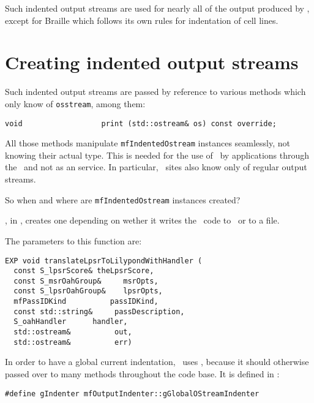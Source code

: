 Such indented output streams are used for nearly all of the output produced by \mf, except for Braille which follows its own rules for indentation of cell lines.


\section{Creating indented output streams}

Such indented output streams are passed by reference to various methods which only know of {\tt osstream}, among them:
\begin{lstlisting}[language=CPlusPlus]
    void                  print (std::ostream& os) const override;
\end{lstlisting}

All those methods manipulate {\tt mfIndentedOstream} instances seamlessly, not knowing their actual type.
This is needed for the use of \mf\ by applications through the \API\ and not as an service. In particular, \Web\ sites also know only of regular output streams.

So when and where are {\tt mfIndentedOstream} instances created?

, in , creates one depending on wether it writes the \lily\ code to \standardOutput\ or to a file.

The parameters to this function are:
\begin{lstlisting}[language=CPlusPlus]
EXP void translateLpsrToLilypondWithHandler (
  const S_lpsrScore& theLpsrScore,
  const S_msrOahGroup&     msrOpts,
  const S_lpsrOahGroup&    lpsrOpts,
  mfPassIDKind          passIDKind,
  const std::string&     passDescription,
  S_oahHandler      handler,
  std::ostream&          out,
  std::ostream&          err)
\end{lstlisting}

In order to have a global current indentation, \mf\ uses , because it should otherwise passed over to many methods throughout the code base. It is defined in :
\begin{lstlisting}[language=CPlusPlus]
#define gIndenter mfOutputIndenter::gGlobalOStreamIndenter
\end{lstlisting}

